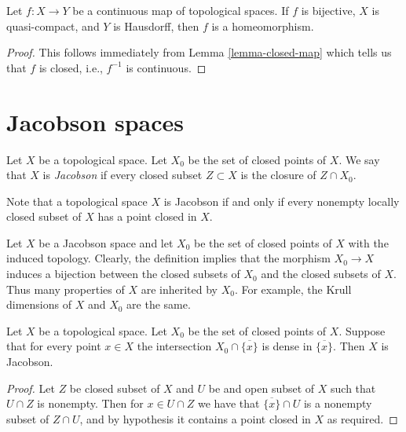 \begin{lemma}
\label{lemma-bijective-map}
Let $f : X \to Y$ be a continuous map of topological spaces.
If $f$ is bijective, $X$ is quasi-compact, and $Y$ is Hausdorff,
then $f$ is a homeomorphism.
\end{lemma}

\begin{proof}
This follows immediately from Lemma \ref{lemma-closed-map}
which tells us that $f$ is closed, i.e., $f^{-1}$ is
continuous.
\end{proof}













\section{Jacobson spaces}
\label{section-space-jacobson}

\begin{definition}
\label{definition-space-jacobson}
Let $X$ be a topological space.
Let $X_0$ be the set of closed points of $X$.
We say that $X$ is {\it Jacobson} if every
closed subset $Z \subset X$ is the closure
of $Z \cap X_0$.
\end{definition}

\noindent
Note that a topological space $X$ is Jacobson if and only if
every nonempty locally closed subset of $X$
has a point closed in $X$.

\medskip\noindent
Let $X$ be a Jacobson space and let $X_0$ be the set
of closed points of $X$ with the induced topology.
Clearly, the definition implies that the morphism
$X_0 \to X$ induces a bijection between the closed
subsets of $X_0$ and the closed subsets of $X$.
Thus many properties of $X$ are inherited by $X_0$.
For example, the Krull dimensions of $X$ and $X_0$
are the same.

\begin{lemma}
\label{lemma-jacobson-check-irreducible-closed}
Let $X$ be a topological space. Let $X_0$ be the set
of closed points of $X$.
Suppose that for every point $x\in X$
the intersection $X_0 \cap \overline{\{x\}}$ is dense in $\overline{\{x\}}$.
Then $X$ is Jacobson.
\end{lemma}

\begin{proof}
Let $Z$ be closed subset of $X$
and $U$ be and open subset of $X$
such that $U\cap Z$ is nonempty.
Then for $x\in U\cap Z$ we have that $\overline{\{x\}}\cap U$ is a nonempty
subset of $Z\cap U$,
and by hypothesis it contains a point closed in $X$ as required.
\end{proof}

